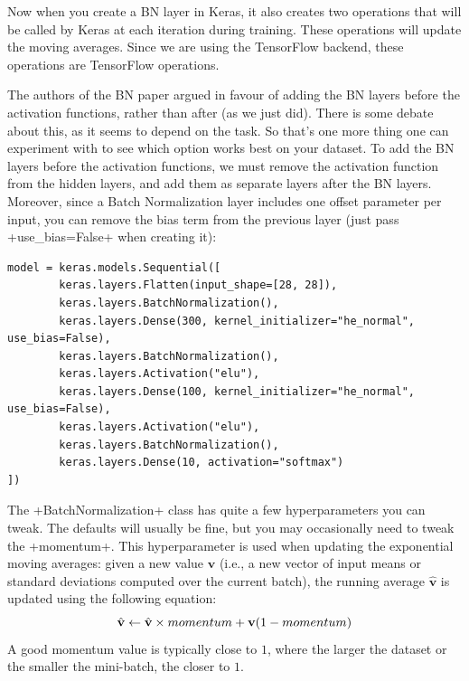 Now when you create a BN layer in Keras, it also creates two operations that will be called by Keras at each iteration during training. These operations will update the moving averages. Since we are using the TensorFlow backend, these operations are TensorFlow operations.

The authors of the BN paper argued in favour of adding the BN layers before the activation functions, rather than after (as we just did). There is some debate about this, as it seems to depend on the task. So that's one more thing one can experiment with to see which option works best on your dataset. To add the BN layers before the activation functions, we must remove the activation function from the hidden layers, and add them as separate layers after the BN layers. Moreover, since a Batch Normalization layer includes one offset parameter per input, you can remove the bias term from the previous layer (just pass \cd+use_bias=False+ when creating it):
\begin{lstlisting}
model = keras.models.Sequential([
        keras.layers.Flatten(input_shape=[28, 28]),
        keras.layers.BatchNormalization(),
        keras.layers.Dense(300, kernel_initializer="he_normal", use_bias=False),
        keras.layers.BatchNormalization(),
        keras.layers.Activation("elu"),
        keras.layers.Dense(100, kernel_initializer="he_normal", use_bias=False),
        keras.layers.Activation("elu"),
        keras.layers.BatchNormalization(),
        keras.layers.Dense(10, activation="softmax")
])
\end{lstlisting}
The \cd+BatchNormalization+ class has quite a few hyperparameters you can tweak. The defaults will usually be fine, but you may occasionally need to tweak the \cd+momentum+. This hyperparameter is used when updating the exponential moving averages: given a new value $\mathbf{v}$ (i.e., a new vector of input means or standard deviations computed over the current batch), the running average $\hat{\mathbf{v}}$ is updated using the following equation:
\begin{equation}
\hat{\mathbf{v}} \leftarrow \hat{\mathbf{v}} \times momentum + \mathbf{v} \br{1-momentum}
\end{equation}
A good momentum value is typically close to $1$, where the larger the dataset or the smaller the mini-batch, the closer to $1$.

